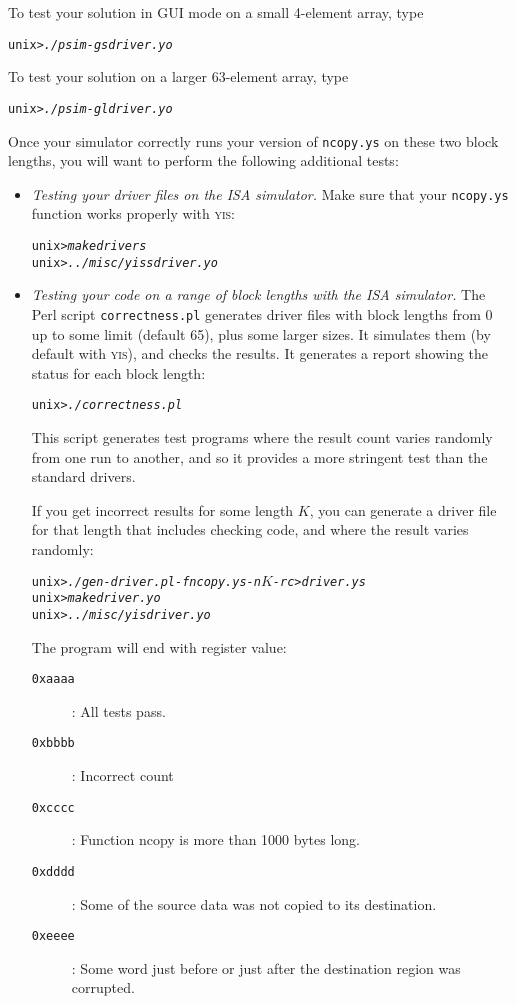 \documentclass[11pt]{article}
\newenvironment{tty}%
{\small\begin{alltt}}%
{\end{alltt}}
\newenvironment{codefrag}%
{\small\begin{alltt}}%
{\end{alltt}%
}
\begin{document}
To test your solution in GUI mode on a small 4-element array, type
\begin{codefrag}
unix> {\em ./psim -g sdriver.yo}
\end{codefrag}
To test your solution on a larger 63-element array, type
\begin{codefrag}
unix> {\em ./psim -g ldriver.yo}
\end{codefrag}
Once your simulator correctly runs your version of \texttt{ncopy.ys} on 
these two block lengths,
you will want to perform the following additional tests:
\begin{itemize}
\item {\em Testing your driver files on the ISA simulator.} Make 
sure that your \texttt{ncopy.ys} function works properly with
\textsc{yis}:
\begin{codefrag}
unix> {\em make drivers}
unix> {\em ../misc/yis sdriver.yo}
\end{codefrag}

\item
{\em Testing your code on a range of block lengths with the ISA
simulator.}  The Perl script \texttt{correctness.pl} generates driver
files with block lengths from 0 up to some limit (default 65), plus
some larger sizes.  It
simulates them (by default with \textsc{yis}), and checks the results.  It
generates a report showing the status for each block length:
\begin{tty}
unix> {\em ./correctness.pl}
\end{tty}
This script generates test programs where the result count varies
randomly from one run to another, and so it provides a more stringent
test than the standard drivers.

If you get incorrect results for some length $K$, you can generate a
driver file for that length that includes checking code, and where the
result varies randomly:
\begin{tty}
unix> {\em ./gen-driver.pl -f ncopy.ys -n \(K\) -rc > driver.ys}
unix> {\em make driver.yo}
unix> {\em ../misc/yis driver.yo}
\end{tty}
The program will end with register \verb@%eax@ having the following
value:
\begin{description}
\item[\texttt{0xaaaa}]: All tests pass.
\item[\texttt{0xbbbb}]: Incorrect count
\item[\texttt{0xcccc}]: Function ncopy is more than 1000 bytes long.
\item[\texttt{0xdddd}]: Some of the source data was not copied to its
destination.
\item[\texttt{0xeeee}]: Some word just before or just after the
destination region was corrupted.
\end{description}


\end{itemize}
\end{document}

